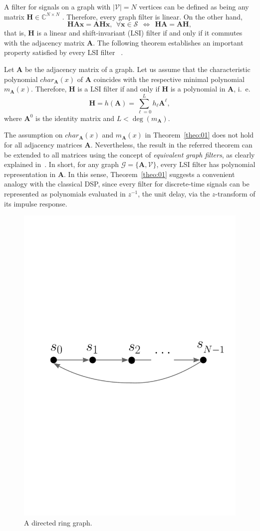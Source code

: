 A filter for signals on a graph with $ |\mathcal{V}| = N $ vertices can be defined as being any matrix $ \mathbf{H} \in \mathbb{C}^{N \times N} $ \cite{sandryhaila2013discrete}. Therefore, every graph filter is linear. On the other hand,
\begin{equation}\label{eq:shift_invariance}
\mathbf{HA}\mathbf{x} = \mathbf{AH}\mathbf{x},\:\:\forall \mathbf{x} \in \mathcal{S} \:\:\Leftrightarrow\:\:\mathbf{HA} = \mathbf{AH},
\end{equation}
\noindent that is, $ \mathbf{H} $ is a linear and shift-invariant (LSI) filter if and only if it commutes with the adjacency matrix $ \mathbf{A} $. The following theorem establishes an important property satisfied by every LSI filter~\cite{sandryhaila2013discrete} .
\vspace{0.2cm}
\begin{theorem}
	\label{theo:01}
	Let $ \mathbf{A} $ be the adjacency matrix of a graph. Let us assume that the characteristic polynomial $char_{\mathbf{A}}(x)$ of $\mathbf{A}$ coincides with the respective minimal polynomial $m_{\mathbf{A}}(x) $. Therefore, $ \mathbf{H} $ is a LSI filter if and only if $ \mathbf{H} $ is a polynomial in $ \mathbf{A} $, i.~e.
	\begin{equation}\label{eq:filtro}
	\mathbf{H} = h(\mathbf{A}) = \sum_{\ell=0}^{L} h_\ell \mathbf{A}^\ell,
	\end{equation}
where $ \mathbf{A}^0 $ is the identity matrix and $ L < \deg(m_{\mathbf{A}}) $.
\end{theorem}

The assumption on $char_{\mathbf{A}}(x)$ and $m_{\mathbf{A}}(x)$ in Theorem~\ref{theo:01} does not hold for all adjacency matrices $\mathbf{A}$. Nevertheless, the result in the referred theorem can be extended to all matrices using the concept of \emph{equivalent graph filters}, as clearly explained in~\cite{sandryhaila2013filters}. In short, for any graph $\mathcal{G} = \{\mathbf{A}, \mathcal{V}\}$, every LSI filter has polynomial representation in $\mathbf{A}$. In this sense, Theorem~\ref{theo:01} suggests a convenient analogy with the classical DSP, since every filter for discrete-time signals can be represented as polynomials evaluated in $ z^{-1} $, the unit delay, via the $z$-transform of its impulse response.

\begin{figure}[t!]
	\centering
\includegraphics[width=0.3\linewidth]{Figures/signal_ring_graph_white_border.pdf}
	\caption{A directed ring graph.}%
	\label{fig:graphs}%
	\vspace{-0.5cm}
\end{figure}
